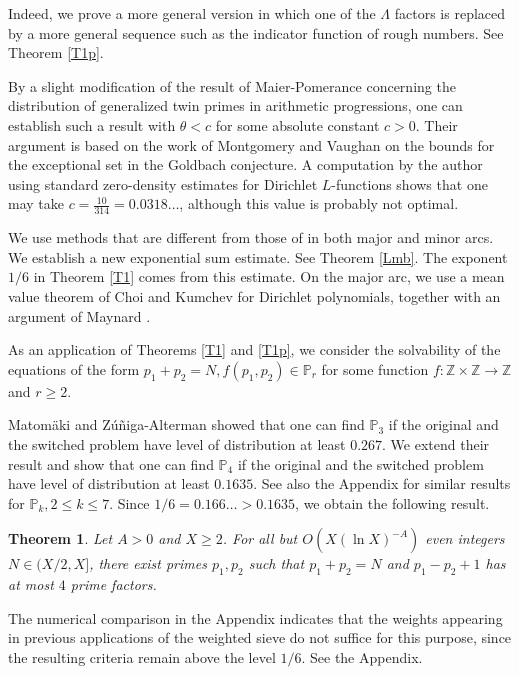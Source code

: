 \documentclass[10pt,a4paper]{amsart}
\newtheorem{thm}[dfn]{Theorem}
\newcommand{\1}{
    \bm{1}
}
\begin{document}
Indeed, we prove a more general version in which one of the $\Lambda$ factors is replaced by a more general sequence such as the indicator function of rough numbers. See Theorem \ref{T1p}. 


By a slight modification of the result of Maier-Pomerance \cite[Theorem 3.1]{maier1990unusually} concerning the distribution of generalized twin primes in arithmetic progressions, one can establish such a result with $\theta < c$ for some absolute constant $c>0$. Their argument is based on the work of Montgomery and Vaughan \cite{montgomery1975exceptional} on the bounds for the exceptional set in the Goldbach conjecture. 
A computation by the author using standard zero-density estimates for Dirichlet $L$-functions shows that one may take $c = \frac{10}{314} = 0.0318\ldots$, although this value is probably not optimal. 


We use methods that are different from those of \cite{maier1990unusually} in both major and minor arcs. 
We establish a new exponential sum estimate. See Theorem \ref{Lmb}. The exponent $1/6$ in Theorem \ref{T1} comes from this estimate. 
On the major arc, we use a mean value theorem of Choi and Kumchev \cite{choi2006mean} for Dirichlet polynomials, together with an argument of Maynard \cite{maynard2024note}. 


As an application of Theorems \ref{T1} and \ref{T1p}, we consider the solvability of the equations of the form $p_1+p_2=N, f(p_1,p_2) \in \mathbb{P}_{r}$ for some function $f:\mathbb{Z} \times \mathbb{Z} \to \mathbb{Z}$ and $r \geq 2$. 



Matom{\"a}ki and Z{\'u}{\~n}iga-Alterman \cite{matomaki2025weighted} showed that one can find $\mathbb{P}_3$ if the original and the switched problem have level of distribution at least $0.267$. 
We extend their result and show that one can find $\mathbb{P}_4$ if the original and the switched problem have level of distribution at least $0.1635$. See also the Appendix for similar results for $\mathbb{P}_k, 2 \leq k \leq 7$. 
Since $1/6=0.166\ldots>0.1635$, we obtain the following result. 
\begin{thm}\label{T2}
Let $A>0$ and $X \geq 2$. 
For all but $O(X(\ln{X})^{-A})$ even integers $N \in (X/2,X]$, there exist primes $p_1,p_2$ such that $p_1+p_2=N$ and $p_1-p_2+1$ has at most $4$ prime factors. 
\end{thm}
The numerical comparison in the Appendix indicates that the weights appearing in previous applications of the weighted sieve do not suffice for this purpose, since the resulting criteria remain above the level $1/6$. See the Appendix.
\end{document}
